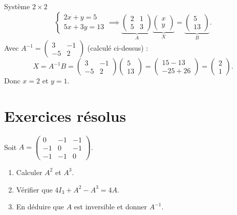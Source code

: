 \begin{exemple}{Système $2\times 2$}
	\[
	\begin{cases} 2x + y = 5 \\ 5x + 3y = 13 \end{cases}
	\implies
	\underbrace{\begin{pmatrix}2&1\\5&3\end{pmatrix}}_{A}
	\underbrace{\begin{pmatrix}x\\y\end{pmatrix}}_{X}
	=
	\underbrace{\begin{pmatrix}5\\13\end{pmatrix}}_{B}.
	\]
	Avec $A^{-1}=\begin{pmatrix}3&-1\\-5&2\end{pmatrix}$ (calculé ci-dessus) :
	\[
	X = A^{-1}B = \begin{pmatrix}3&-1\\-5&2\end{pmatrix}\begin{pmatrix}5\\13\end{pmatrix}
	= \begin{pmatrix}15-13\\-25+26\end{pmatrix}
	= \begin{pmatrix}2\\1\end{pmatrix}.
	\]
	Donc $x=2$ et $y=1$.
\end{exemple}

\section{Exercices résolus}

\begin{exercice}{\etoilepleine\etoilevide\etoilevide}
	Soit $A = \begin{pmatrix}0&-1&-1\\-1&0&-1\\-1&-1&0\end{pmatrix}$.
	\begin{enumerate}
		\item Calculer $A^2$ et $A^3$.
		\item Vérifier que $4I_3 + A^2 - A^3 = 4A$.
		\item En déduire que $A$ est inversible et donner $A^{-1}$.
	\end{enumerate}
\end{exercice}

